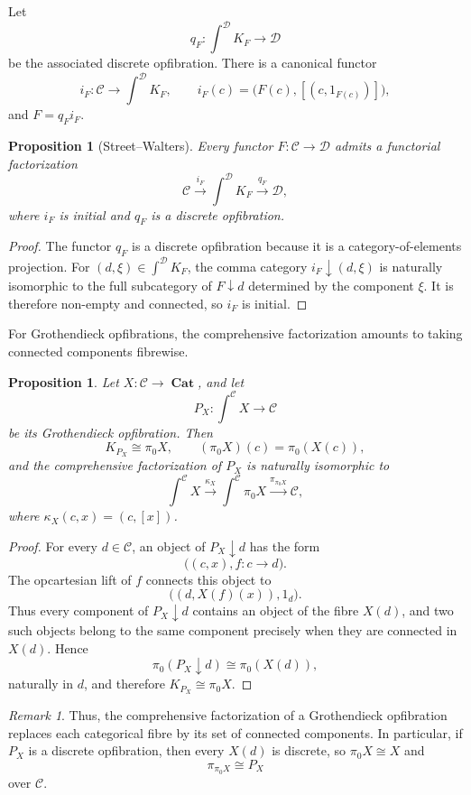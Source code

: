\documentclass[12pt]{amsart}
\newtheorem{proposition}[teo]{Proposition}
\theoremstyle{definition}
\theoremstyle{remark}
\newtheorem{remark}{Remark}
\numberwithin{figure}{section}%
\newcommand{\CC}{\mathcal{C}}
\newcommand{\cat}{\mathop{\mathbf{Cat}}}
\newcommand{\Dc}{\mathcal{D}}
\begin{document}
Let
\[
q_F\colon\int^\Dc K_F\longrightarrow\Dc
\]
be the associated discrete opfibration. There is a canonical functor
\[
i_F\colon\CC\longrightarrow\int^\Dc K_F,
\qquad
i_F(c)=\bigl(F(c),[(c,1_{F(c)})]\bigr),
\]
and \(F=q_Fi_F\).

\begin{proposition}[Street--Walters]
\label{prop:comprehensive_factorization}
Every functor \(F\colon\CC\to\Dc\) admits a functorial factorization
\[
\CC
\xrightarrow{i_F}
\int^\Dc K_F
\xrightarrow{q_F}
\Dc,
\]
where \(i_F\) is initial and \(q_F\) is a discrete opfibration.
\end{proposition}

\begin{proof}
The functor \(q_F\) is a discrete opfibration because it is a
category-of-elements projection. For
\((d,\xi)\in\int^\Dc K_F\), the comma category
\(i_F\downarrow(d,\xi)\) is naturally isomorphic to the full subcategory
of \(F\downarrow d\) determined by the component \(\xi\). It is therefore
non-empty and connected, so \(i_F\) is initial.
\end{proof}

For Grothendieck opfibrations, the comprehensive factorization amounts to
taking connected components fibrewise.

\begin{proposition}\label{prop:comprehensive_grothendieck}
Let \(X\colon\CC\to\cat\), and let
\[
P_X\colon\int^\CC X\longrightarrow\CC
\]
be its Grothendieck opfibration. Then
\[
K_{P_X}\cong\pi_0X,
\qquad
(\pi_0X)(c)=\pi_0(X(c)),
\]
and the comprehensive factorization of \(P_X\) is naturally isomorphic to
\[
\int^\CC X
\xrightarrow{\kappa_X}
\int^\CC\pi_0X
\xrightarrow{\pi_{\pi_0X}}
\CC,
\]
where \(\kappa_X(c,x)=(c,[x])\).
\end{proposition}

\begin{proof}
For every \(d\in\CC\), an object of \(P_X\downarrow d\) has the form
\[
\bigl((c,x),f\colon c\to d\bigr).
\]
The opcartesian lift of \(f\) connects this object to
\[
\bigl((d,X(f)(x)),1_d\bigr).
\]
Thus every component of \(P_X\downarrow d\) contains an object of the
fibre \(X(d)\), and two such objects belong to the same component precisely
when they are connected in \(X(d)\). Hence
\[
\pi_0(P_X\downarrow d)\cong\pi_0(X(d)),
\]
naturally in \(d\), and therefore \(K_{P_X}\cong\pi_0X\).
\end{proof}

\begin{remark}
Thus, the comprehensive factorization of a Grothendieck opfibration
replaces each categorical fibre by its set of connected components. In
particular, if \(P_X\) is a discrete opfibration, then every \(X(d)\) is
discrete, so \(\pi_0X\cong X\) and
\[
\pi_{\pi_0X}\cong P_X
\]
over \(\CC\).
\end{remark}
\end{document}
